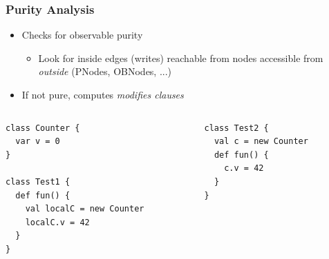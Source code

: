 \documentclass[hyperref={pdfpagelabels=false}]{beamer}
\begin{document}
\begin{frame}[fragile]
    \frametitle{Purity Analysis}
    \begin{itemize}
        \item Checks for observable purity
            \begin{itemize}
                \item Look for inside edges (writes) reachable from nodes
accessible from \emph{outside} (PNodes, OBNodes, ...)
            \end{itemize}
        \item If not pure, computes \emph{modifies clauses}
    \end{itemize}

    \begin{columns}
      \begin{column}{0.5\textwidth}
\begin{lstlisting}
class Counter {
  var v = 0
}

class Test1 {
  def fun() {
    val localC = new Counter
    localC.v = 42
  }
}
\end{lstlisting}
      \end{column}
      \begin{column}{0.5\textwidth}
\begin{lstlisting}
class Test2 {
  val c = new Counter
  def fun() {
    c.v = 42
  }
}
\end{lstlisting}
      \end{column}
    \end{columns}
\end{frame}
\end{document}
